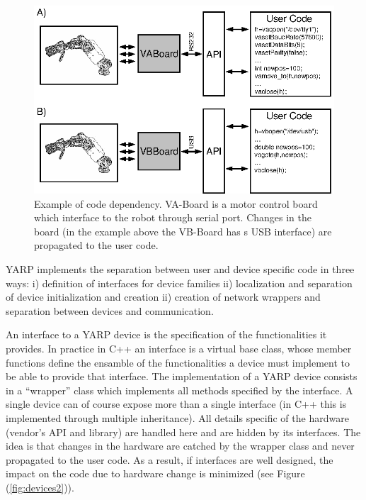 \begin{figure}[tbp]
\centerline{
\includegraphics[width=24cm]{fig-devices1.eps}
}
\caption{Example of code dependency. VA-Board is a 
motor control board which interface to the robot through serial port. 
Changes in the board (in the example above the VB-Board has s USB 
interface) are propagated to the user code.}\label{fig:devices1}
\end{figure}

YARP implements the separation between user and device specific code 
in three ways: i) definition of interfaces for device families ii) 
localization and separation of device initialization and creation 
ii) creation of network wrappers and separation between devices and 
communication. 

An interface to a YARP device is the specification of the functionalities
it provides. In practice in C++ an interface is a virtual base class, whose 
member functions define the ensamble of the functionalities a device must 
implement to be able to provide that interface. The implementation of a 
YARP device consists in a ``wrapper'' class which implements all 
methods specified by the interface. A single device can of course expose 
more than a single interface (in C++ this is implemented through multiple
inheritance). All details specific of the hardware 
(vendor's API and library) are handled here and are hidden by its interfaces. 
The idea is that changes in the hardware are catched by the wrapper class and never 
propagated to the user code. As a result, if interfaces are well designed,
 the impact on the code due to hardware change is minimized (see Figure 
(\ref{fig:devices2})). 

